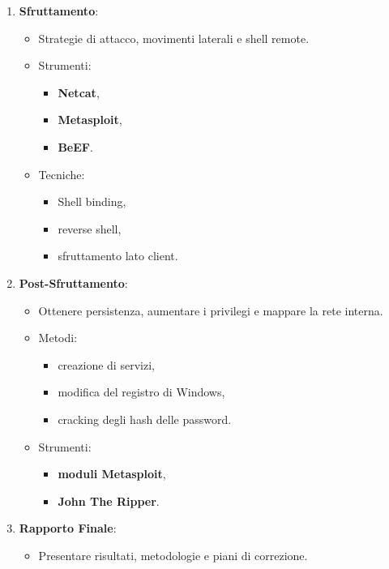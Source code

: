 \documentclass[12pt]{article}
\begin{document}
\begin{enumerate}
\begin{enumerate}
        \item \textbf{Sfruttamento}:
        \begin{itemize}
            \item Strategie di attacco, movimenti laterali e shell remote.
            \item Strumenti: 
            \begin{itemize}
                \item \textbf{Netcat},
                \item \textbf{Metasploit},
                \item \textbf{BeEF}.
            \end{itemize}
            \item Tecniche: 
            \begin{itemize}
                \item Shell binding,
                \item reverse shell,
                \item sfruttamento lato client.
            \end{itemize}
        \end{itemize}
        \item \textbf{Post-Sfruttamento}:
        \begin{itemize}
            \item Ottenere persistenza, aumentare i privilegi e mappare la rete 
            interna.
            \item Metodi:
            \begin{itemize}
                \item creazione di servizi,
                \item modifica del registro di Windows,
                \item cracking degli hash delle password.
            \end{itemize} 
            \item Strumenti: 
            \begin{itemize}
                \item \textbf{moduli Metasploit},
                \item \textbf{John The Ripper}.
            \end{itemize}
        \end{itemize}
        \item \textbf{Rapporto Finale}:
        \begin{itemize}
            \item Presentare risultati, metodologie e piani di correzione.

\end{itemize}
\end{enumerate}
\end{enumerate}
\end{document}
